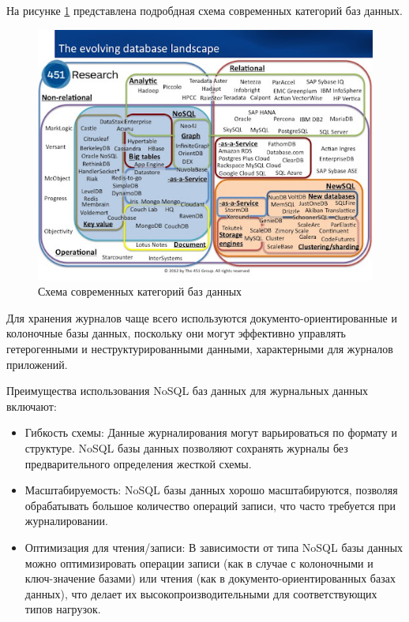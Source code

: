 \documentclass[14pt, russian]{scrartcl}
\begin{document}
На рисунке \ref{fig:dblandscape} представлена подробдная схема современных категорий баз данных.

\begin{figure}[H]
	\centering
	\begin{minipage}[t]{.9\textwidth}
		\centering
		\includegraphics[width=.7\textwidth]{./imgs/dblandscape.jpg}
	\end{minipage}
	\caption{Схема современных категорий баз данных}
	\label{fig:dblandscape}
\end{figure}


Для хранения журналов чаще всего используются документо-ориентированные и колоночные базы данных,
поскольку они могут эффективно управлять гетерогенными и неструктурированными данными, характерными для журналов приложений.

Преимущества использования NoSQL баз данных для журнальных данных включают:

\begin{itemize}

	\item Гибкость схемы: Данные журналирования могут варьироваться по формату и структуре. NoSQL базы данных позволяют сохранять журналы без предварительного определения жесткой схемы.
	\item Масштабируемость: NoSQL базы данных хорошо масштабируются, позволяя обрабатывать большое количество операций записи, что часто требуется при журналировании.
	\item Оптимизация для чтения/записи: В зависимости от типа NoSQL базы данных можно оптимизировать операции записи (как в случае с колоночными и ключ-значение базами) или чтения (как в документо-ориентированных базах данных), что делает их высокопроизводительными для соответствующих типов нагрузок.
\end{itemize}
\end{document}
